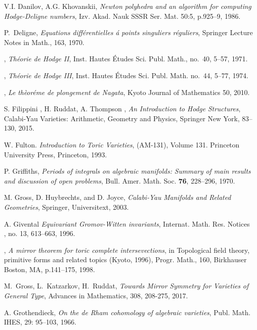 \documentclass{article}
\numberwithin{equation}{section}
\begin{document}
\begin{thebibliography}{70}
V.I. Danilov, A.G. Khovanskii, \emph{Newton polyhedra and an algorithm for computing Hodge-Deligne numbers}, Izv. Akad. Nauk SSSR Ser. Mat. 50:5, p.925–9, 1986.


P.~Deligne, \emph{Equations diff{\'{e}}rentielles {\'{a}} points singuliers r{\'{e}}guliers}, Springer Lecture Notes in Math., 163, 1970.


  
\bysame, \emph{Th{\'{e}}orie de {H}odge {II}}, Inst. Hautes {\'E}tudes Sci. Publ. Math., no.~40, 5--57, 1971.

  
\bysame, \emph{Th{\'{e}}orie de {H}odge {III}}, Inst. Hautes {\'E}tudes Sci. Publ. Math. no.~44, 5--77, 1974.


\bysame, \emph{Le thèoréme de plongement de Nagata}, Kyoto Journal of Mathematics 50, 2010.


S. Filippini , H. Ruddat, A. Thompson ,
   \emph{An Introduction to Hodge Structures}, Calabi-Yau Varieties: Arithmetic, Geometry and Physics, Springer New York, 83–130, 2015. 


  W. Fulton. \emph{Introduction to Toric Varieties}, (AM-131), Volume 131. Princeton University
Press, Princeton, 1993.

P. Griffiths, \emph{Periods of integrals on algebraic manifolds: Summary of main
  results and discussion of open problems}, Bull. Amer. Math. Soc. \textbf{76},  228--296, 1970.


M. Gross, D. Huybrechts, and D. Joyce, \emph{Calabi-Yau Manifolds and Related Geometries}, Springer, Universitext, 2003.


 A. Givental \emph{Equivariant Gromov-Witten invariants}, Internat. Math. Res. Notices , no. 13, 613–663, 1996.


\bysame, \emph{A mirror theorem for toric complete intersevections}, in Topological field theory, primitive forms and related topics (Kyoto, 1996), Progr. Math., 160, Birkhauser Boston, MA, p.141–175, 1998.


 M.~Gross, L.~Katzarkov, H.~Ruddat, \emph{Towards Mirror Symmetry for Varieties of General Type}, Advances in Mathematics, 308, 208-275, 2017.

 A. Grothendieck, \emph{On the de Rham cohomology of algebraic varieties}, Publ. Math. IHES, 29: 95–103, 1966.



\end{thebibliography}
\end{document}
